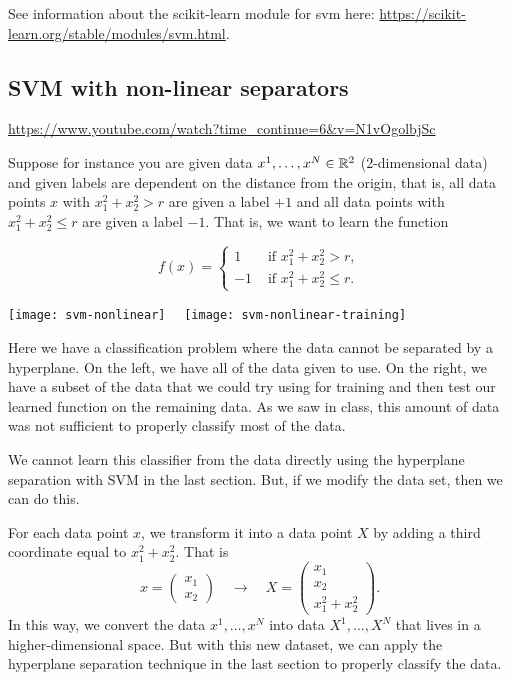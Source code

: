 \documentclass[../open-optimization/open-optimization.tex]{subfiles}
\begin{document}
See information about the scikit-learn module for svm here:
\url{https://scikit-learn.org/stable/modules/svm.html}.

\subsection{SVM with non-linear separators}




\url{https://www.youtube.com/watch?time_continue=6&v=N1vOgolbjSc}




Suppose for instance you are given data $x^1, \dots, x^N \in {\mathbb{R}}^2$ (2-dimensional data) and given labels are dependent on the distance from the origin, that is,  all data points $x$ with  $x_1^2 + x_2^2 > r$ are given a label $+1$ and all data points with $x_1^2 + x_2^2 \leq r$ are given a label $-1$.   That is, we want to learn the function 

\begin{equation}
f(x) = \begin{cases}
1 & \text{ if } x_1^2 + x_2^2 >  r,\\
-1 & \text{ if } x_1^2 + x_2^2 \leq r.
\end{cases}
\end{equation}

\begin{example}
\begin{center}
\texttt{[image: svm-nonlinear]} \ \ \texttt{[image: svm-nonlinear-training]}
\end{center}
Here we have a classification problem where the data cannot be separated by a hyperplane.  On the left, we have all of the data given to use.  On the right, we have a subset of the data that we could try using for training and then test our learned function on the remaining data.  As we saw in class, this amount of data was not sufficient to properly classify most of the data.
\end{example}

We cannot learn this classifier from the data directly using the hyperplane separation with SVM in the last section.  But, if we modify the data set, then we can do this.  

For each data point $x$, we transform it into a data point $X$ by adding a third coordinate equal to $x_1^2 + x_2^2$.  That is 
\begin{equation}
x = \begin{pmatrix} x_1 \\ x_2 \end{pmatrix} \quad \rightarrow \quad X = \begin{pmatrix} x_1 \\ x_2 \\ x_1^2 + x_2^2 \end{pmatrix}.
\end{equation}
In this way, we convert the data $x^1, \dots, x^N$ into data $X^1, \dots, X^N$ that lives in a higher-dimensional space.  But with this new dataset, we can apply the hyperplane separation technique in the last section to properly classify the data.
\end{document}
